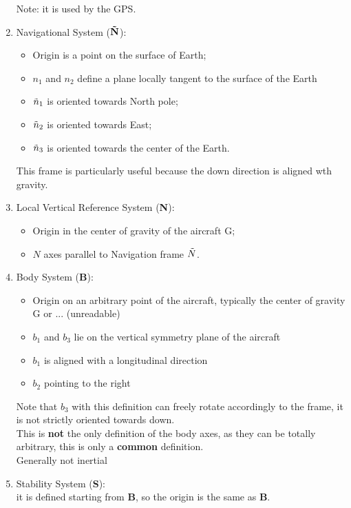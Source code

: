 \begin{enumerate}
\begin{itemize}
    \end{itemize}
    Note: it is used by the GPS.
    \item Navigational System ($\mathbf{\Tilde{N}}$):
    \begin{itemize}
        \item Origin is a point on the surface of Earth;
        \item $n_1$ and $n_2$ define a plane locally tangent to the surface of the Earth
        \item $\Tilde{n}_1$ is oriented towards North pole;
        \item $\Tilde{n}_2$ is oriented towards East;
        \item $\Tilde{n}_3$ is oriented towards the center of the Earth.
    \end{itemize}
    This frame is particularly useful because the down direction is aligned wth gravity.
    \item Local Vertical Reference System (\textbf{N}):
    \begin{itemize}
        \item Origin in the center of gravity of the aircraft G;
        \item $N$ axes parallel to Navigation frame $\Tilde{N}$.
    \end{itemize}
    \item Body System (\textbf{B}):
    \begin{itemize}
        \item Origin on an arbitrary point of the aircraft, typically the center of gravity G or ... (unreadable)
        \item $b_1$ and $b_3$ lie on the vertical symmetry plane of the aircraft
        \item $b_1$ is aligned with a longitudinal direction
        \item $b_2$ pointing to the right
    \end{itemize}
    Note that $b_3$ with this definition can freely rotate accordingly to the frame, it is not strictly oriented towards down. 
    \\
    This is \textbf{not} the only definition of the body axes, as they can be totally arbitrary, this is only a \textbf{common} definition.
    \\
    Generally not inertial
    \item Stability System (\textbf{S}):\\
    it is defined starting from \textbf{B}, so the origin is the same as \textbf{B}.
    \begin{itemize}

\end{itemize}
\end{enumerate}
